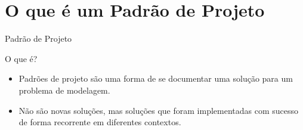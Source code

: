 
\section{O que é um Padrão de Projeto}

\begin{frame}{Padrão de Projeto}{}
\begin{block}{O que é?}
  \begin{itemize}
    \item<1-> Padrões de projeto são uma forma de se documentar uma solução para um problema de modelagem.
    \item<1-> Não são novas soluções, mas soluções que foram implementadas com sucesso de forma recorrente em diferentes contextos. \cite{guerra}
  \end{itemize}
\end{block}
\end{frame}

